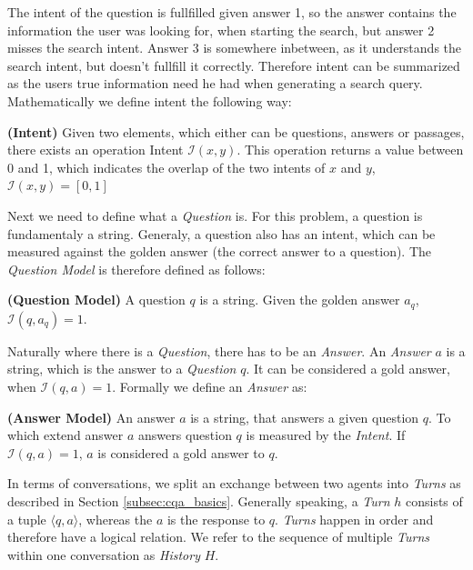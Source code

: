 The intent of the question is fullfilled given answer 1, so the answer contains the information the user was looking for, when starting the search, but answer 2 misses the search intent. Answer 3 is somewhere inbetween, as it understands the search intent, but doesn't fullfill it correctly. Therefore intent can be summarized as the users true information need he had when generating a search query. Mathematically we define intent the following way:

\begin{definition}
    \textbf{(Intent)} Given two elements, which either can be questions, answers or passages, there exists an operation Intent $\mathcal{I}(x, y)$. This operation returns a value between 0 and 1, which indicates the overlap of the two intents of $x$ and $y$, $\mathcal{I}(x, y) = [0,1]$ 
    \label{def:intent}
\end{definition}

Next we need to define what a \textit{Question} is. For this problem, a question is fundamentaly a string. Generaly, a question also has an intent, which can be measured against the golden answer (the correct answer to a question). The \textit{Question Model} is therefore defined as follows:

\begin{definition}
    \textbf{(Question Model)} A question $q$ is a string. Given the golden answer $a_q$, $\mathcal{I}(q, a_q) = 1$.
    \label{def:question_model}
\end{definition}

Naturally where there is a \textit{Question}, there has to be an \textit{Answer}. An \textit{Answer} $a$ is a string, which is the answer to a \textit{Question} $q$. It can be considered a gold answer, when $\mathcal{I}(q,a) = 1$. Formally we define an \textit{Answer} as:

\begin{definition}
    \textbf{(Answer Model)} An answer $a$ is a string, that answers a given question $q$. To which extend answer $a$ answers question $q$ is measured by the \textit{Intent}. If $\mathcal{I}(q,a) = 1$, $a$ is considered a gold answer to $q$.
    \label{def:answer_model}
\end{definition}

In terms of conversations, we split an exchange between two agents into \textit{Turns} as described in Section \ref{subsec:cqa_basics}. Generally speaking, a \textit{Turn} $h$ consists of a tuple $\langle q,a\rangle$, whereas the $a$ is the response to $q$. \textit{Turns} happen in order and therefore have a logical relation. We refer to the sequence of multiple \textit{Turns} within one conversation as \textit{History} $H$.

